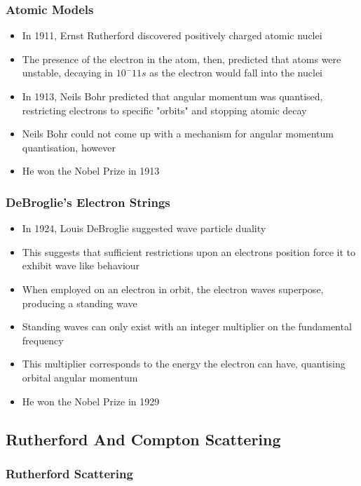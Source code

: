 \documentclass{article}
\begin{document}
\subsubsection*{Atomic Models}

\begin{itemize}
    \item In 1911, Ernst Rutherford discovered positively charged atomic nuclei
    \item The presence of the electron in the atom, then, predicted that atoms were unstable, decaying in $10^-11 s$ as the electron would fall into the nuclei 
    \item In 1913, Neils Bohr predicted that angular momentum was quantised, restricting electrons to specific "orbits" and stopping atomic decay
    \item Neils Bohr could not come up with a mechanism for angular momentum quantisation, however
    \item He won the Nobel Prize in 1913
\end{itemize}

\subsubsection*{DeBroglie's Electron Strings}


\begin{itemize}
    \item In 1924, Louis DeBroglie suggested wave particle duality
    \item This suggests that sufficient restrictions upon an electrons position force it to exhibit wave like behaviour
    \item When employed on an electron in orbit, the electron waves superpose, producing a standing wave
    \item Standing waves can only exist with an integer multiplier on the fundamental frequency
    \item This multiplier corresponds to the energy the electron can have, quantising orbital angular momentum
    \item He won the Nobel Prize in 1929
\end{itemize}

\subsection{Rutherford And Compton Scattering}
\subsubsection*{Rutherford Scattering}
\end{document}
